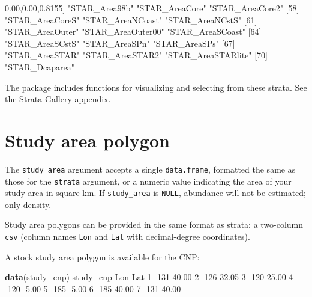 \documentclass[
]{book}
\newenvironment{Shaded}{\begin{snugshade}}{\end{snugshade}}
\newcommand{\DecValTok}[1]{\textcolor[rgb]{0.00,0.00,0.81}{#1}}
\newcommand{\FloatTok}[1]{\textcolor[rgb]{0.00,0.00,0.81}{#1}}
\newcommand{\KeywordTok}[1]{\textcolor[rgb]{0.13,0.29,0.53}{\textbf{#1}}}
\newcommand{\NormalTok}[1]{#1}
\newcommand{\StringTok}[1]{\textcolor[rgb]{0.31,0.60,0.02}{#1}}
\begin{document}
\begin{Shaded}
\begin{Highlighting}[]
\NormalTok{[}\DecValTok{55}\NormalTok{] }\StringTok{"STAR_Area98b"}       \StringTok{"STAR_AreaCore"}      \StringTok{"STAR_AreaCore2"}    
\NormalTok{[}\DecValTok{58}\NormalTok{] }\StringTok{"STAR_AreaCoreS"}     \StringTok{"STAR_AreaNCoast"}    \StringTok{"STAR_AreaNCstS"}    
\NormalTok{[}\DecValTok{61}\NormalTok{] }\StringTok{"STAR_AreaOuter"}     \StringTok{"STAR_AreaOuter00"}   \StringTok{"STAR_AreaSCoast"}   
\NormalTok{[}\DecValTok{64}\NormalTok{] }\StringTok{"STAR_AreaSCstS"}     \StringTok{"STAR_AreaSPn"}       \StringTok{"STAR_AreaSPs"}      
\NormalTok{[}\DecValTok{67}\NormalTok{] }\StringTok{"STAR_AreaSTAR"}      \StringTok{"STAR_AreaSTAR2"}     \StringTok{"STAR_AreaSTARlite"} 
\NormalTok{[}\DecValTok{70}\NormalTok{] }\StringTok{"STAR_Dcaparea"}     
\end{Highlighting}
\end{Shaded}

The package includes functions for visualizing and selecting from these strata. See the \protect\hyperlink{stratagallery}{Strata Gallery} appendix.

\hypertarget{study-area-polygon}{%
\section*{Study area polygon}\label{study-area-polygon}}

The \texttt{study\_area} argument accepts a single \texttt{data.frame}, formatted the same as those for the \texttt{strata} argument, or a numeric value indicating the area of your study area in square km. If \texttt{study\_area} is \texttt{NULL}, abundance will not be estimated; only density.

Study area polygons can be provided in the same format as strata: a two-column \texttt{csv} (column names \texttt{Lon} and \texttt{Lat} with decimal-degree coordinates).

A stock study area polygon is available for the CNP:

\begin{Shaded}
\begin{Highlighting}[]
\KeywordTok{data}\NormalTok{(study_cnp) }
\NormalTok{study_cnp}
\NormalTok{   Lon   Lat}
\DecValTok{1} \DecValTok{-131} \FloatTok{40.00}
\DecValTok{2} \DecValTok{-126} \FloatTok{32.05}
\DecValTok{3} \DecValTok{-120} \FloatTok{25.00}
\DecValTok{4} \DecValTok{-120} \FloatTok{-5.00}
\DecValTok{5} \DecValTok{-185} \FloatTok{-5.00}
\DecValTok{6} \DecValTok{-185} \FloatTok{40.00}
\DecValTok{7} \DecValTok{-131} \FloatTok{40.00}
\end{Highlighting}
\end{Shaded}
\end{document}
